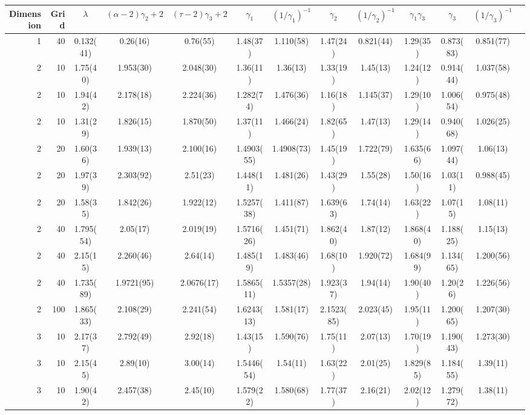 \begin{tabular}{rr|ccccccccccc}
\toprule
Dimension & Grid & $\lambda$ & $(\alpha - 2)\gamma_2 + 2$ & $(\tau - 2)\gamma_3 + 2$ & $\gamma_1$ & $(1/\gamma_1)^{-1}$ & $\gamma_2$ & $(1/\gamma_2)^{-1}$ & $\gamma_1 \gamma_3$ & $\gamma_3$ & $(1/\gamma_3)^{-1}$ \\
\midrule
1 & 40 & 0.132(41) & 0.26(16) & 0.76(55) & 1.48(37) & 1.110(58) & 1.47(24) & 0.821(44) & 1.29(35) & 0.873(83) & 0.851(77) \\
2 & 10 & 1.75(40) & 1.953(30) & 2.048(30) & 1.36(11) & 1.36(13) & 1.33(19) & 1.45(13) & 1.24(12) & 0.914(44) & 1.037(58) \\
2 & 10 & 1.94(42) & 2.178(18) & 2.224(36) & 1.282(74) & 1.476(36) & 1.16(18) & 1.145(37) & 1.29(10) & 1.006(54) & 0.975(48) \\
2 & 10 & 1.31(29) & 1.826(15) & 1.870(50) & 1.37(11) & 1.466(24) & 1.82(65) & 1.47(13) & 1.29(14) & 0.940(68) & 1.026(25) \\
2 & 20 & 1.60(36) & 1.939(13) & 2.100(16) & 1.4903(55) & 1.4908(73) & 1.45(19) & 1.722(79) & 1.635(66) & 1.097(44) & 1.06(13) \\
2 & 20 & 1.97(39) & 2.303(92) & 2.51(23) & 1.448(11) & 1.481(26) & 1.43(29) & 1.55(28) & 1.50(16) & 1.03(11) & 0.988(45) \\
2 & 20 & 1.58(35) & 1.842(26) & 1.922(12) & 1.5257(38) & 1.411(87) & 1.639(63) & 1.74(14) & 1.63(22) & 1.07(15) & 1.08(11) \\
2 & 40 & 1.795(54) & 2.05(17) & 2.019(19) & 1.5716(26) & 1.451(71) & 1.862(40) & 1.87(12) & 1.868(40) & 1.188(25) & 1.15(13) \\
2 & 40 & 2.15(15) & 2.260(46) & 2.64(14) & 1.485(19) & 1.483(46) & 1.68(10) & 1.920(72) & 1.684(99) & 1.134(65) & 1.200(56) \\
2 & 40 & 1.735(89) & 1.9721(95) & 2.0676(17) & 1.5865(11) & 1.5357(28) & 1.923(37) & 1.94(14) & 1.90(40) & 1.20(26) & 1.226(56) \\
2 & 100 & 1.865(33) & 2.108(29) & 2.241(54) & 1.6243(13) & 1.581(17) & 2.1523(85) & 2.023(45) & 1.95(11) & 1.200(65) & 1.207(30) \\
3 & 10 & 2.17(37) & 2.792(49) & 2.92(18) & 1.43(15) & 1.590(76) & 1.75(11) & 2.07(13) & 1.70(19) & 1.190(43) & 1.273(30) \\
3 & 10 & 2.15(45) & 2.89(10) & 3.00(14) & 1.5446(54) & 1.54(11) & 1.63(22) & 2.01(25) & 1.829(85) & 1.184(55) & 1.39(11) \\
3 & 10 & 1.90(42) & 2.457(38) & 2.45(10) & 1.579(22) & 1.580(68) & 1.77(37) & 2.16(21) & 2.02(12) & 1.279(72) & 1.38(11) \\

\end{tabular}
